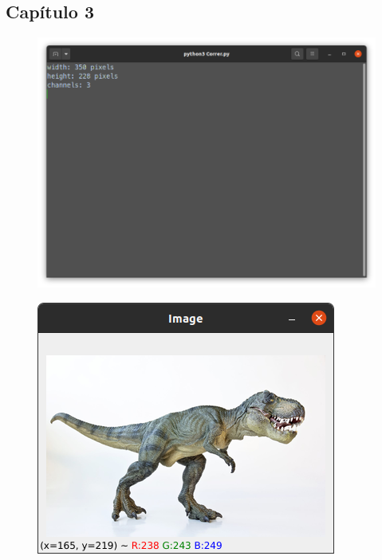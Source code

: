 \documentclass[12pt,letterpaper]{article}
\begin{document}
\begin{multicols}{2}


\section{Capítulo 3}

\begin{figure}[H]
\centering
\includegraphics[width = \columnwidth]{Terminal_ch3.png}
\end{figure}

\begin{figure}[H]
\centering
\includegraphics[width = \columnwidth]{Resultado_ch3.png}
\end{figure}


\end{multicols}
\end{document}
